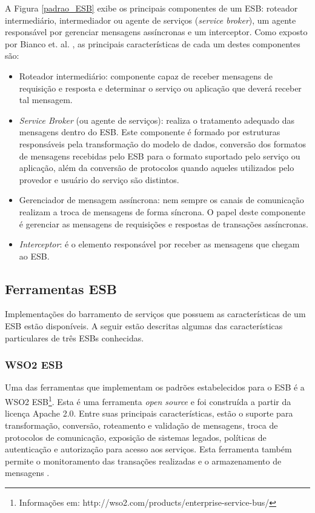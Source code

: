 A Figura \ref{padrao_ESB} exibe os principais componentes de um ESB: roteador intermediário, intermediador ou agente de serviços (\textit{service broker}), um agente responsável por gerenciar mensagens assíncronas e um interceptor. Como exposto por Bianco et. al. \cite{bianco_architecting_2011}, as principais características de cada um destes componentes são:

\begin{itemize}

\item Roteador intermediário: componente capaz de receber mensagens de requisição e resposta e determinar o serviço ou aplicação que deverá receber tal mensagem.

\item \textit{Service Broker} (ou agente de serviços): realiza o tratamento adequado das mensagens dentro do ESB. Este componente é formado por estruturas responsáveis pela transformação do modelo de dados, conversão dos formatos de mensagens recebidas pelo ESB para o formato suportado pelo serviço ou aplicação, além da conversão de protocolos quando aqueles utilizados pelo provedor e usuário do serviço são distintos.

\item Gerenciador de mensagem assíncrona: nem sempre os canais de comunicação realizam a troca de mensagens de forma síncrona. O papel deste componente é gerenciar as mensagens de requisições e respostas de transações assíncronas.

\item \textit{Interceptor}: é o elemento responsável por receber as mensagens que chegam ao ESB.
\end{itemize}

\subsection{Ferramentas ESB}

Implementações do barramento de serviços que possuem as características de um ESB estão disponíveis. A seguir estão descritas algumas das características particulares de três ESBs conhecidas.

\subsubsection{WSO2 ESB}
Uma das ferramentas que implementam os padrões estabelecidos para o ESB é a WSO2 ESB\footnote{Informações em: http://wso2.com/products/enterprise-service-bus/}. Esta é uma ferramenta \textit{open source} e foi construída a partir da licença Apache 2.0. Entre suas principais características, estão o suporte para transformação, conversão, roteamento e validação de mensagens, troca de protocolos de comunicação, exposição de sistemas legados, políticas de autenticação e autorização para acesso aos serviços. Esta ferramenta também permite o monitoramento das transações realizadas e o armazenamento de mensagens \cite{siriwardena_enterprise_2013}.

